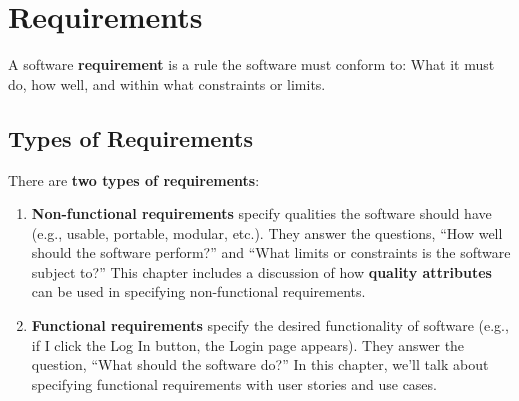 \yesmargins
\chapter{Requirements}
\marginpar{ \requirementDef\margindivider}\marginpar{\nonFunctionalRequirementDef\margindivider}\marginpar{\functionalRequirementDef}A software \textbf{requirement} is a rule the software must conform to: What it must do, how well, and within what constraints or limits.

\section{Types of Requirements}

There are \textbf{two types of requirements}:

\begin{enumerate}
\item \textbf{Non-functional requirements} specify qualities the software should have (e.g., usable, portable, modular, etc.). They answer the questions, ``How well should the software perform?'' and ``What limits or constraints is the software subject to?'' This chapter includes a discussion of how \textbf{quality attributes}\marginpar{\qualityAttributeDef} can be used in specifying non-functional requirements.
\item \textbf{Functional requirements} specify the desired functionality of software (e.g., if I click the Log In button, the Login page appears). They answer the question, ``What should the software do?'' In this chapter, we'll talk about specifying functional requirements with user stories and use cases.
\end{enumerate}

\begin{center}
\end{center}

